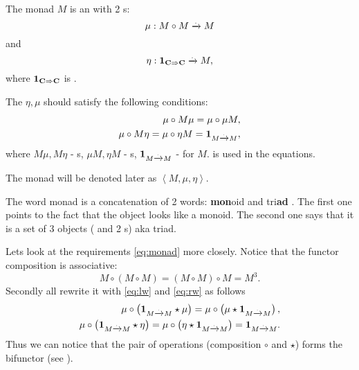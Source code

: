 \begin{definition}[Monad]
  \label{def:monad}
  The monad $M$ is an  with 2
  s:
  \begin{equation}
    \label{eq:monad_mu}
    \mu: M \circ M \xrightarrow{.} M
  \end{equation}
  and
  \begin{equation}
    \label{eq:monad_eta}
    \eta: \mathbf{1}_{ \mathbf{C} \Rightarrow \mathbf{C} } \xrightarrow{.} M,
  \end{equation}
  where $\mathbf{1}_{ \mathbf{C} \Rightarrow \mathbf{C} }$ is .

  The $\eta, \mu$ should satisfy the following conditions:
  \begin{eqnarray}
    \mu \circ M \mu = \mu \circ \mu M, 
    \nonumber \\
    \mu \circ M \eta = \mu \circ \eta M = \mathbf{1}_{ M \xrightarrow{.} M },
    \label{eq:monad}
  \end{eqnarray}
  where $M \mu, M \eta$ - s, $\mu M, \eta M$ -
  s, $\mathbf{1}_{ M \xrightarrow{.} M }$ -  for $M$.
   is used in the equations.

  The monad will be denoted later as $\left<M, \mu, \eta\right>$.
\end{definition}

\begin{remark}
The word monad is a concatenation of 2 words: \textbf{mon}oid and
tri\textbf{ad} \cite[p.~138]{bib:maclane98}. The first one points to the fact
that the object looks 
like a monoid. The second one says that it is a set of 3 objects
( and 2 s) aka triad. 
\end{remark}

Lets look at the requirements \eqref{eq:monad} more closely. Notice
that the functor composition is associative:
\[
M \circ ( M \circ M ) = (M \circ M) \circ M = M^3.
\]
Secondly 
all rewrite it with \eqref{eq:lw} and \eqref{eq:rw} as follows
\begin{eqnarray}
  \mu \circ \left( \mathbf{1}_{ M \xrightarrow{.} M } \star \mu \right) = 
  \mu \circ \left( \mu \star \mathbf{1}_{ M \xrightarrow{.} M } \right), 
  \nonumber \\
  \mu \circ \left( \mathbf{1}_{ M \xrightarrow{.} M } \star \eta \right) = 
  \mu \circ \left( \eta \star \mathbf{1}_{ M \xrightarrow{.} M } \right) = \mathbf{1}_{ M \xrightarrow{.} M }.
  \label{eq:monad_p1}
\end{eqnarray}
Thus we can notice that the pair of operations (composition $\circ$
and  $\star$) forms the bifunctor (see
). 

